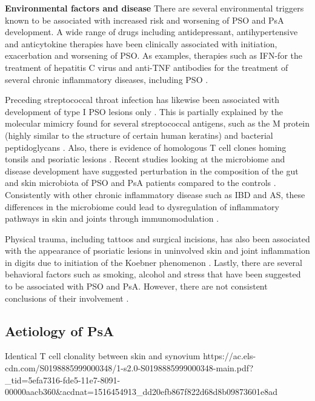 \textbf{Environmental factors and disease}
There are several environmental triggers known to be associated with increased risk and worsening of PSO and PsA development. A wide range of drugs including antidepressant, antihypertensive and anticytokine therapies have been clinically associated with initiation, exacerbation and worsening of PSO. As examples, therapies such as IFN-\alpha for the treatment of hepatitis C virus and anti-TNF antibodies for the treatment of several chronic inflammatory diseases, including PSO \parencite{Kim2010}.

Preceding streptococcal throat infection has likewise been associated with development of type I PSO lesions only \parencite{Gudjonsson2003}. This is partially explained by the molecular mimicry found for several streptococcal antigens, such as the M protein (highly similar to the structure of certain human keratins) and bacterial peptidoglycans \parencite{Valdimarsson2009}. Also, there is evidence of homologous T cell clones homing tonsils and psoriatic lesions \parencite{Diluvio2006}. Recent studies looking at the microbiome and disease development have suggested perturbation in the composition of the gut and skin microbiota of PSO and PsA patients compared to the controls \parencite{Yan2017}. Consistently with other chronic inflammatory disease such as IBD and AS, these differences in the microbiome could lead to dysregulation of inflammatory pathways in skin and joints through immunomodulation \parencite{Eppinga2014}.

Physical trauma, including tattoos and surgical incisions, has also been associated with the appearance of psoriatic lesions in uninvolved skin and joint inflammation in digits \parencite {Nestle2009} due to initiation of the Koebner phenomenon \parencite{Weiss2002}. Lastly, there are several behavioral factors such as smoking, alcohol and stress that have been suggested to be associated with PSO and PsA. However, there are not consistent conclusions of their involvement \parencite{Meglio2014}.




\subsection{Aetiology of PsA}


Identical T cell clonality between skin and synovium https://ac.els-cdn.com/S0198885999000348/1-s2.0-S0198885999000348-main.pdf?_tid=5efa7316-fde5-11e7-8091-00000aacb360&acdnat=1516454913_dd20efb867f822d68d8b09873601e8ad

